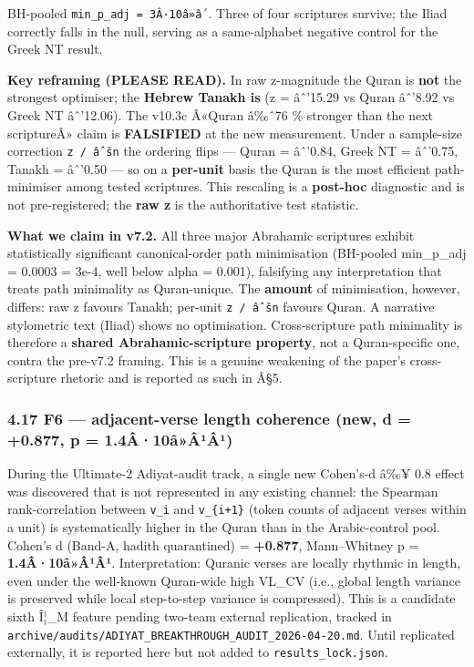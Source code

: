 \documentclass[
]{article}
\begin{document}
BH-pooled \texttt{min\_p\_adj\ =\ 3Â·10â»â´}. Three of four scriptures
survive; the Iliad correctly falls in the null, serving as a
same-alphabet negative control for the Greek NT result.

\textbf{Key reframing (PLEASE READ).} In raw z-magnitude the Quran is
\textbf{not} the strongest optimiser; the \textbf{Hebrew Tanakh is} (z =
âˆ'15.29 vs Quran âˆ'8.92 vs Greek NT âˆ'12.06). The v10.3c Â«Quran
â‰ˆ76 \% stronger than the next scriptureÂ» claim is \textbf{FALSIFIED}
at the new measurement. Under a sample-size correction
\texttt{z\ /\ âˆšn} the ordering flips --- Quran = âˆ'0.84, Greek NT =
âˆ'0.75, Tanakh = âˆ'0.50 --- so on a \textbf{per-unit} basis the Quran
is the most efficient path-minimiser among tested scriptures. This
rescaling is a \textbf{post-hoc} diagnostic and is not pre-registered;
the \textbf{raw z} is the authoritative test statistic.

\textbf{What we claim in v7.2.} All three major Abrahamic scriptures
exhibit statistically significant canonical-order path minimisation
(BH-pooled min\_p\_adj = 0.0003 = 3e-4, well below alpha = 0.001),
falsifying any interpretation that treats path minimality as
Quran-unique. The \textbf{amount} of minimisation, however, differs: raw
z favours Tanakh; per-unit \texttt{z\ /\ âˆšn} favours Quran. A
narrative stylometric text (Iliad) shows no optimisation.
Cross-scripture path minimality is therefore a \textbf{shared
Abrahamic-scripture property}, not a Quran-specific one, contra the
pre-v7.2 framing. This is a genuine weakening of the paper's
cross-scripture rhetoric and is reported as such in Â§5.

\subsubsection{4.17 F6 --- adjacent-verse length coherence (new, d =
+0.877, p =
1.4Â·10â»Â¹Â¹)}\label{f6-adjacent-verse-length-coherence-new-d-0.877-p-1.4uxe210uxe2uxe2uxb9uxe2uxb9}

During the Ultimate-2 Adiyat-audit track, a single new Cohen's-d â‰¥ 0.8
effect was discovered that is not represented in any existing channel:
the Spearman rank-correlation between \texttt{\textbar{}v\_i\textbar{}}
and \texttt{\textbar{}v\_\{i+1\}\textbar{}} (token counts of adjacent
verses within a unit) is systematically higher in the Quran than in the
Arabic-control pool. Cohen's d (Band-A, hadith quarantined) =
\textbf{+0.877}, Mann--Whitney p = \textbf{1.4Â·10â»Â¹Â¹}.
Interpretation: Quranic verses are locally rhythmic in length, even
under the well-known Quran-wide high VL\_CV (i.e., global length
variance is preserved while local step-to-step variance is compressed).
This is a candidate sixth Î¦\_M feature pending two-team external
replication, tracked in
\texttt{archive/audits/ADIYAT\_BREAKTHROUGH\_AUDIT\_2026-04-20.md}.
Until replicated externally, it is reported here but not added to
\texttt{results\_lock.json}.
\end{document}
